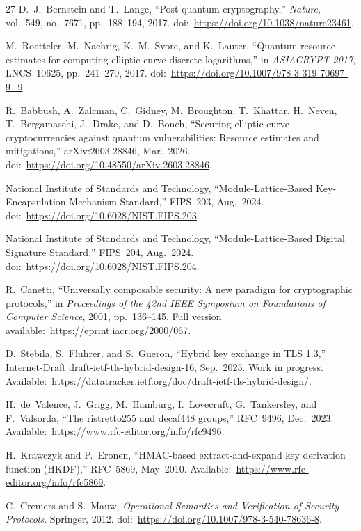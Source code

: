 \documentclass[conference]{IEEEtran}
\begin{document}
\begin{thebibliography}{27}
D.~J.~Bernstein and T.~Lange, ``Post-quantum cryptography,'' \emph{Nature}, vol.~549, no.~7671, pp.~188--194, 2017. doi:~\url{https://doi.org/10.1038/nature23461}.

M.~Roetteler, M.~Naehrig, K.~M.~Svore, and K.~Lauter, ``Quantum resource estimates for computing elliptic curve discrete logarithms,'' in \emph{ASIACRYPT 2017}, LNCS~10625, pp.~241--270, 2017. doi:~\url{https://doi.org/10.1007/978-3-319-70697-9_9}.

R.~Babbush, A.~Zalcman, C.~Gidney, M.~Broughton, T.~Khattar,
H.~Neven, T.~Bergamaschi, J.~Drake, and D.~Boneh,
``Securing elliptic curve cryptocurrencies against quantum vulnerabilities:
Resource estimates and mitigations,'' arXiv:2603.28846, Mar.~2026.
doi:~\url{https://doi.org/10.48550/arXiv.2603.28846}.

National Institute of Standards and Technology, ``Module-Lattice-Based Key-Encapsulation Mechanism Standard,'' FIPS~203, Aug.~2024. doi:~\url{https://doi.org/10.6028/NIST.FIPS.203}.

National Institute of Standards and Technology, ``Module-Lattice-Based Digital Signature Standard,'' FIPS~204, Aug.~2024. doi:~\url{https://doi.org/10.6028/NIST.FIPS.204}.

R.~Canetti, ``Universally composable security: A new paradigm for cryptographic protocols,'' in \emph{Proceedings of the 42nd IEEE Symposium on Foundations of Computer Science}, 2001, pp.~136--145. Full version available:~\url{https://eprint.iacr.org/2000/067}.

D.~Stebila, S.~Fluhrer, and S.~Gueron, ``Hybrid key exchange in TLS 1.3,'' Internet-Draft draft-ietf-tls-hybrid-design-16, Sep.~2025. Work in progress. Available:~\url{https://datatracker.ietf.org/doc/draft-ietf-tls-hybrid-design/}.

H.~de~Valence, J.~Grigg, M.~Hamburg, I.~Lovecruft, G.~Tankersley, and F.~Valsorda, ``The ristretto255 and decaf448 groups,'' RFC~9496, Dec.~2023. Available:~\url{https://www.rfc-editor.org/info/rfc9496}.

H.~Krawczyk and P.~Eronen, ``HMAC-based extract-and-expand key derivation function (HKDF),'' RFC~5869, May~2010. Available:~\url{https://www.rfc-editor.org/info/rfc5869}.

C.~Cremers and S.~Mauw, \emph{Operational Semantics and Verification of Security Protocols}. Springer, 2012. doi:~\url{https://doi.org/10.1007/978-3-540-78636-8}.


\end{thebibliography}
\end{document}
